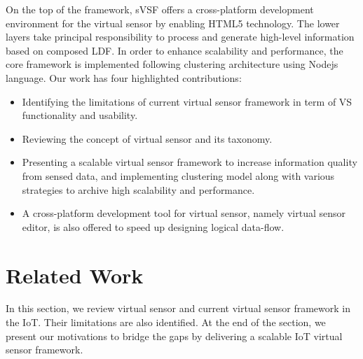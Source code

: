 On the top of the framework, sVSF offers a cross-platform development environment for the virtual sensor by enabling HTML5 technology. The lower layers take principal responsibility to process and generate high-level information based on composed LDF. In order to enhance scalability and performance, the core framework is implemented following clustering architecture using Nodejs language. Our work has four highlighted contributions:

\begin{itemize}
    \item Identifying the limitations of current virtual sensor framework in term of VS functionality and usability.
    
    \item Reviewing the concept of virtual sensor and its taxonomy.
    
    \item Presenting a scalable virtual sensor framework to increase information quality from sensed data, and implementing clustering model along with various strategies to archive high scalability and performance. 
    
    \item A cross-platform development tool for virtual sensor, namely virtual sensor editor, is also offered to speed up designing logical data-flow.
\end{itemize}


\section{Related Work}

In this section, we review virtual sensor and current virtual sensor framework in the IoT. Their limitations are also identified. At the end of the section, we present our motivations to bridge the gaps by delivering a scalable IoT virtual sensor framework.\\

